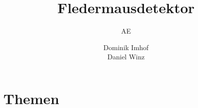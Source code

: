 \documentclass{beamer}
\title{Fledermausdetektor}
\subtitle{AE}
\author{Dominik Imhof \\ Daniel Winz}
\begin{document}
\maketitle


\section*{Themen}
\begin{frame}
\tableofcontents
\end{frame}







\end{document}
